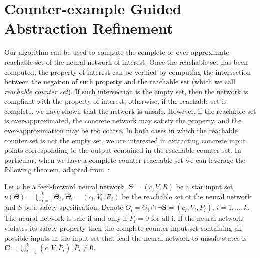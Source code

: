 \section{Counter-example Guided Abstraction Refinement}
\label{sec:cegar}

Our algorithm can be used to compute the complete or over-approximate 
reachable set of the neural network of interest. Once the reachable 
set has been computed, the property of interest can be verified by computing
the intersection between the negation of such property and the reachable 
set (which we call \textit{reachable counter set}). If such intersection is 
the empty set, then the network is compliant with the property of interest; 
otherwise, if the reachable set is complete, we have shown that the network 
is unsafe. However, if the reachable set is over-approximated, the concrete 
network may satisfy the property, and the over-approximation may be too coarse.
In both cases in which the reachable counter set is not the empty set, we are 
interested in extracting concrete input points corresponding to the output 
contained in the reachable counter set.
In particular, when we have a complete counter reachable set we can leverage 
the following theorem, adapted from~\cite{tran2020verification}:

\begin{theorem}
	\label{th:counter-input}
	Let $\nu$ be a feed-forward neural network, $\Theta = (c, V, R)$ be a star 
	input set, $\nu(\Theta) = \bigcup_{i=1}^k \Theta_i$, $\Theta_i = 
	(c_i, V_i, R_i)$ be the reachable set of the neural network and \emph{S} be a 
	safety specification. Denote $\overline{\Theta}_i = \Theta_i \cap \neg 
	\mathbf{S} = (c_i, V_i, \overline{P}_i)$, $i = 1, ..., k$. The neural network 
	is safe if and only if $\overline{P}_i = 0$ for all i. If the neural network 
	violates its safety property then the complete counter input set containing all 
	possible inputs in the input set that lead the neural network to unsafe states 
	is $\mathbf{C} = \bigcup_{i=1}^k (c, V, \overline{P}_i), \overline{P}_i \neq 0$.
\end{theorem}

